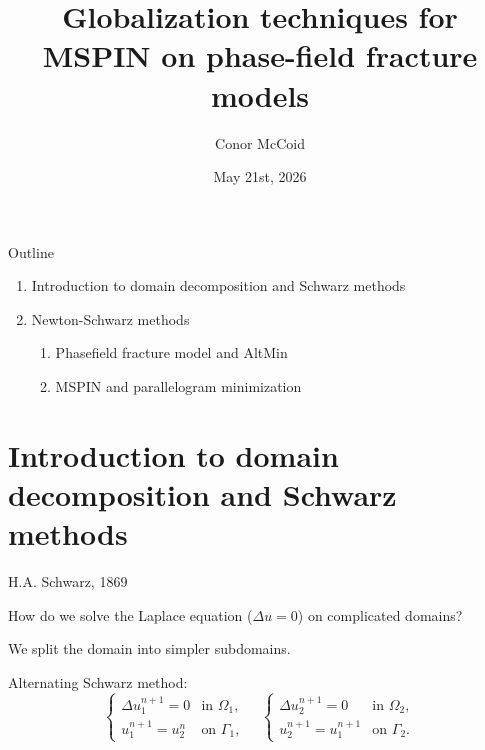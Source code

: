 \documentclass[10pt]{beamer}
\title{Globalization techniques for MSPIN on phase-field fracture models}
\author{Conor McCoid}
\institute{Joint work with Blaise Bourdin at McMaster University}
\date{May 21st, 2026}
\begin{document}
\maketitle

\begin{frame}{Outline}

\begin{enumerate}
\item Introduction to domain decomposition and Schwarz methods
\item Newton-Schwarz methods
	\begin{enumerate}
	\item Phasefield fracture model and AltMin
	\item MSPIN and parallelogram minimization
	\end{enumerate}
\end{enumerate}
\end{frame}

\section{Introduction to domain decomposition and Schwarz methods} %

\begin{frame}{H.A. Schwarz, 1869}

How do we solve the Laplace equation ($\Delta u =0$) on complicated domains?

We split the domain into simpler subdomains.

\begin{figure}
	\centering
\end{figure}

Alternating Schwarz method:
\begin{equation*}
	\begin{cases} \Delta u_1^{n+1} = 0 & \text{in } \Omega_1, \\ u_1^{n+1} = u_2^n & \text{on } \Gamma_1, \end{cases}
	\quad
	\begin{cases} \Delta u_2^{n+1} = 0 & \text{in } \Omega_2, \\ u_2^{n+1} = u_1^{n+1} & \text{on } \Gamma_2. \end{cases}
\end{equation*}
\end{frame}
\end{document}

